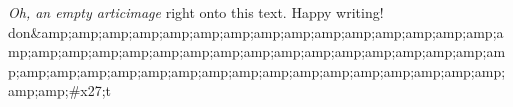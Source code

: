 \textit{Oh, an empty articimage} right onto this text. Happy writing! 
don&amp;amp;amp;amp;amp;amp;amp;amp;amp;amp;amp;amp;amp;amp;amp;amp;amp;amp;amp;amp;amp;amp;amp;amp;amp;amp;amp;amp;amp;amp;amp;amp;amp;amp;amp;amp;amp;amp;amp;amp;amp;amp;amp;amp;amp;amp;amp;amp;amp;amp;#x27;t
